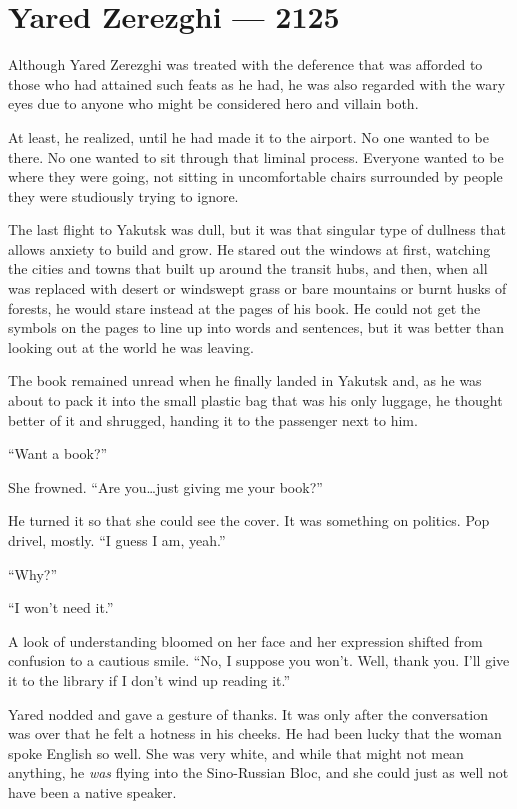 \hypertarget{yared-zerezghi-2125}{%
\chapter{Yared Zerezghi — 2125}\label{yared-zerezghi-2125}}

Although Yared Zerezghi was treated with the deference that was afforded to those who had attained such feats as he had, he was also regarded with the wary eyes due to anyone who might be considered hero and villain both.

At least, he realized, until he had made it to the airport. No one wanted to be there. No one wanted to sit through that liminal process. Everyone wanted to be where they were going, not sitting in uncomfortable chairs surrounded by people they were studiously trying to ignore.

The last flight to Yakutsk was dull, but it was that singular type of dullness that allows anxiety to build and grow. He stared out the windows at first, watching the cities and towns that built up around the transit hubs, and then, when all was replaced with desert or windswept grass or bare mountains or burnt husks of forests, he would stare instead at the pages of his book. He could not get the symbols on the pages to line up into words and sentences, but it was better than looking out at the world he was leaving.

The book remained unread when he finally landed in Yakutsk and, as he was about to pack it into the small plastic bag that was his only luggage, he thought better of it and shrugged, handing it to the passenger next to him.

``Want a book?''

She frowned. ``Are you\ldots just giving me your book?''

He turned it so that she could see the cover. It was something on politics. Pop drivel, mostly. ``I guess I am, yeah.''

``Why?''

``I won't need it.''

A look of understanding bloomed on her face and her expression shifted from confusion to a cautious smile. ``No, I suppose you won't. Well, thank you. I'll give it to the library if I don't wind up reading it.''

Yared nodded and gave a gesture of thanks. It was only after the conversation was over that he felt a hotness in his cheeks. He had been lucky that the woman spoke English so well. She was very white, and while that might not mean anything, he \emph{was} flying into the Sino-Russian Bloc, and she could just as well not have been a native speaker.

